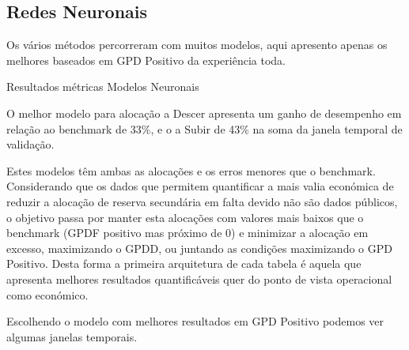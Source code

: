 \subsection{Redes Neuronais \label{se:resml}}

Os vários métodos percorreram com muitos modelos, aqui apresento apenas os melhores baseados em GPD Positivo da experiência toda.\par


\begin{table}[H]
    \caption{Resultados métricas Modelos Neuronais}    
    \resizebox{\linewidth}{!}{}
    \label{tab:mlresmetrics}
    \end{table}

O melhor modelo para alocação a Descer apresenta um ganho de desempenho em relação ao benchmark de 33\%, e o a Subir de 43\% na soma da janela temporal de validação.\par
Estes modelos têm ambas as alocações e os erros menores que o benchmark. Considerando que os dados que permitem quantificar a mais valia económica de reduzir a alocação de reserva secundária em falta devido não são dados públicos, o objetivo passa por manter esta alocações com valores mais baixos que o benchmark (GPDF positivo mas próximo de 0) e minimizar a alocação em excesso, maximizando o GPDD, ou juntando as condições maximizando o GPD Positivo. Desta forma a primeira arquitetura de cada tabela é aquela que apresenta melhores resultados quantificáveis quer do ponto de vista operacional como económico.\par
Escolhendo o modelo com melhores resultados em GPD Positivo podemos ver algumas janelas temporais.\par


